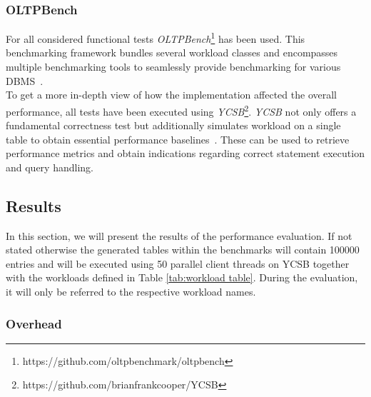 \subsubsection{OLTPBench}

For all considered functional tests \textit{OLTPBench}\footnote{https://github.com/oltpbenchmark/oltpbench} 
has been used. This benchmarking framework bundles several workload classes and 
encompasses multiple benchmarking tools to seamlessly provide benchmarking for various DBMS~\cite{oltp_2013}.\\
To get a more in-depth view of how the implementation affected the overall performance, all tests have been executed 
using \textit{YCSB}\footnote{https://github.com/brianfrankcooper/YCSB}.
\textit{YCSB} not only offers a fundamental correctness test but additionally simulates workload on a single table to obtain essential performance baselines~\cite{ycsb_2010}.
These can be used to retrieve performance metrics and obtain indications regarding correct statement execution and query handling.



\subsection{Results}
\label{sec:results}
In this section, we will present the results of the performance evaluation.
If not stated otherwise the generated tables within the benchmarks will contain 100000 entries and will be executed using
50 parallel client threads on YCSB together with the workloads defined in Table \ref{tab:workload table}.
During the evaluation, it will only be referred to the respective workload names.
  

           

\subsubsection{Overhead} 

